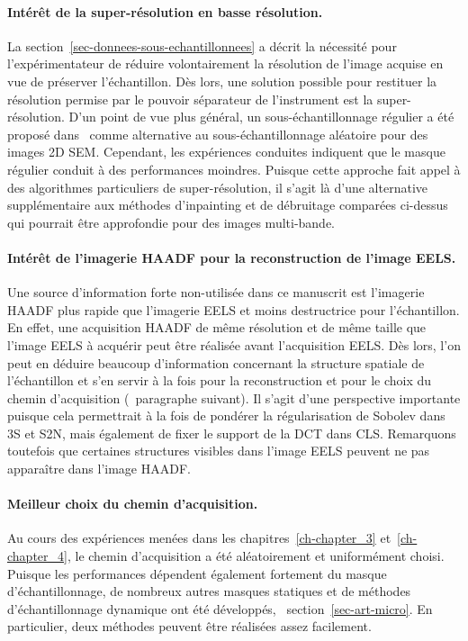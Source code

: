 \paragraph{Intérêt de la super-résolution en basse résolution.} La section~\ref{sec-donnees-sous-echantillonnees} a décrit la nécessité pour l'expérimentateur de réduire volontairement la résolution de l'image acquise en vue de préserver l'échantillon. Dès lors, une solution possible pour restituer la résolution permise par le pouvoir séparateur de l'instrument est la super-résolution. D'un point de vue plus général, un sous-échantillonnage régulier a été proposé dans~\cite{trampert2018ultramicroscopy} comme alternative au sous-échantillonnage aléatoire pour des images 2D SEM. Cependant, les expériences conduites indiquent que le masque régulier conduit à des performances moindres. Puisque cette approche fait appel à des algorithmes particuliers de super-résolution, il s'agit là d'une alternative supplémentaire aux méthodes d'inpainting et de débruitage comparées ci-dessus qui pourrait être approfondie pour des images multi-bande. 

\paragraph{Intérêt de l'imagerie HAADF pour la reconstruction de l'image EELS.} Une source d'information forte non-utilisée dans ce manuscrit est l'imagerie HAADF plus rapide que l'imagerie EELS et moins destructrice pour l'échantillon. En effet, une acquisition HAADF de même résolution et de même taille que l'image EELS à acquérir peut être réalisée avant l'acquisition EELS. Dès lors, l'on peut en déduire beaucoup d'information concernant la structure spatiale de l'échantillon et s'en servir à la fois pour la reconstruction et pour le choix du chemin d'acquisition (\cf\ paragraphe suivant). Il s'agit d'une perspective importante puisque cela permettrait à la fois de pondérer la régularisation de Sobolev dans 3S et S2N, mais également de fixer le support de la DCT dans CLS. Remarquons toutefois que certaines structures visibles dans l'image EELS peuvent ne pas apparaître dans l'image HAADF.

\paragraph{Meilleur choix du chemin d'acquisition.} Au cours des expériences menées dans les chapitres~\ref{ch-chapter_3} et~\ref{ch-chapter_4}, le chemin d'acquisition a été aléatoirement et uniformément choisi. Puisque les performances dépendent également fortement du masque d'échantillonnage, de nombreux autres masques statiques et de méthodes d'échantillonnage dynamique ont été développés, \cf\ section~\ref{sec-art-micro}. En particulier, deux méthodes peuvent être réalisées assez facilement.

